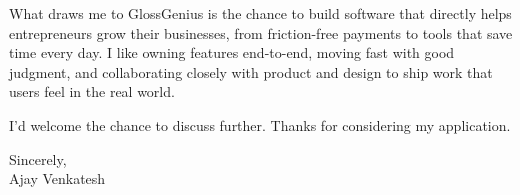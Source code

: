 \documentclass[letterpaper,11pt]{article}
\begin{document}
What draws me to GlossGenius is the chance to build software that directly helps entrepreneurs grow their businesses, from friction-free payments to tools that save time every day. I like owning features end-to-end, moving fast with good judgment, and collaborating closely with product and design to ship work that users feel in the real world.

I'd welcome the chance to discuss further. Thanks for considering my application.

\vspace{12pt}
Sincerely, \\
Ajay Venkatesh
\end{document}

